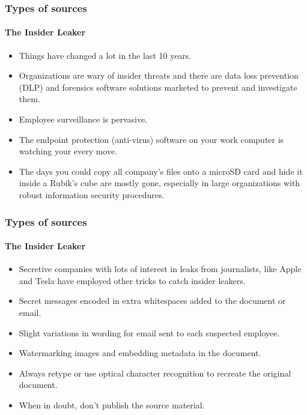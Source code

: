 \documentclass[aspectratio=169,usenames,dvipsnames]{beamer}
\begin{document}
\begin{frame}
  \frametitle{Types of sources}
  \framesubtitle{The Insider Leaker}

  \begin{itemize}[<+->]
    \item Things have changed a lot in the last 10 years.
    \item Organizations are wary of insider threats and there are data loss
      prevention (DLP) and forensics software solutions marketed to prevent
      and investigate them.
    \item Employee surveillance is pervasive.
    \item The endpoint protection (anti-virus) software on your work computer
      is watching your every move.
    \item The days you could copy all company's files onto a microSD card
      and hide it inside a Rubik's cube are mostly gone, especially in large
      organizations with robust information security procedures.
  \end{itemize}

\end{frame}

\begin{frame}
  \frametitle{Types of sources}
  \framesubtitle{The Insider Leaker}

  \begin{itemize}[<+->]
    \item Secretive companies with lots of interest in leaks from
      journalists, like Apple and Tesla have employed other tricks to catch
      insider leakers.
    \item Secret messages encoded in extra whitespaces added to the document
      or email.
    \item Slight variations in wording for email sent to each suspected
      employee.
    \item Watermarking images and embedding metadata in the document.
    \item Always retype or use optical character recognition to recreate the
      original document.
    \item When in doubt, don't publish the source material.
  \end{itemize}

\end{frame}
\end{document}
